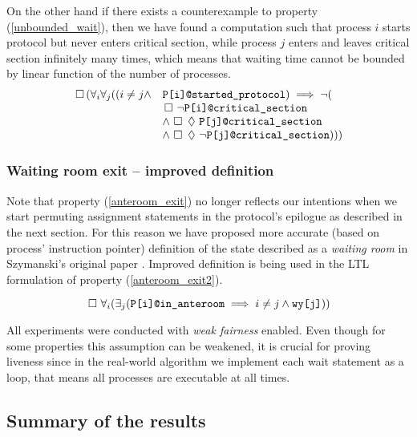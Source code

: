 On the other hand if there exists a counterexample to property (\ref{unbounded_wait}), then we have found a computation such that process $i$ starts protocol but never enters critical section, while process $j$ enters and leaves critical section infinitely many times, which means that waiting time cannot be bounded by linear function of the number of processes.
\begin{equation}
\begin{array}{rl}
\always (\forall_i \forall_j ((i \neq j \land & \verb+P[i]@started_protocol+) \implies \neg ( \\
 & \always \neg \verb+P[i]@critical_section+ \\
 & \land \always \eventually \verb+P[j]@critical_section+ \\
 & \land \always \eventually \neg \verb+P[j]@critical_section+)))
\end{array}
\label{unbounded_wait}
\end{equation}

\subsubsection*{Waiting room exit -- improved definition}

Note that property (\ref{anteroom_exit}) no longer reflects our intentions when we start permuting assignment statements in the protocol's epilogue as described in the next section.
For this reason we have proposed more accurate (based on process' instruction pointer) definition of the state described as a \emph{waiting room} in Szymanski's original paper \cite{Original}.
Improved definition is being used in the LTL formulation of property (\ref{anteroom_exit2}).

\begin{equation}
\always \forall_i (\exists_j (\verb+P[i]@in_anteroom+ \implies i \neq j \land \verb+wy[j]+))
\label{anteroom_exit2}
\end{equation}

All experiments were conducted with \emph{weak fairness} enabled.
Even though for some properties this assumption can be weakened, it is crucial for proving liveness since in the real-world algorithm we implement each wait statement as a loop, that means all processes are executable at all times.

\subsection*{Summary of the results}

